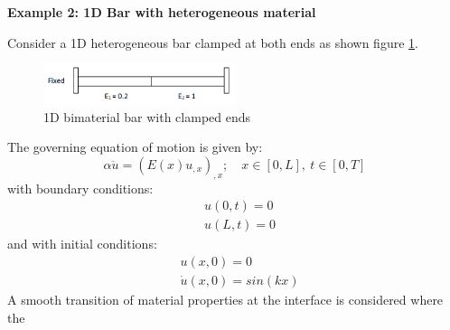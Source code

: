 \documentclass[10pt,letterpaper, onecolumn]{article}
\begin{document}
\noindent \textbf{Example 2: 1D Bar with heterogeneous material}

Consider a 1D heterogeneous bar clamped at both ends as shown figure \ref{fig:7.4}.
%
%
\begin{figure}[H]  %
  \begin{center}
    \includegraphics[width=0.5\textwidth,keepaspectratio=1,scale=1]{images/Bimaterial_bar.png}
  \end{center}
  \caption{1D bimaterial bar with clamped ends}
  \label{fig:7.4}
\end{figure}
%
%
The governing equation of motion is given by:
%
\begin{equation}
\alpha \ddot{u} = (E(x) u_{,x})_{,x}; \quad x \in [0, L], \ t \in [0, T]
\end{equation}
%
with boundary conditions: 
%
\begin{subequations}
\begin{align}
& u(0,t) = 0 \\
& u(L,t) = 0
\end{align}
\end{subequations}
%
and with initial conditions:
%
\begin{subequations}
\begin{align}
& u(x,0) = 0 \\
& \dot{u}(x,0) = sin(kx)
\end{align}
\end{subequations}
%
% 
A smooth transition of material properties at the interface is considered where the 
\end{document}
